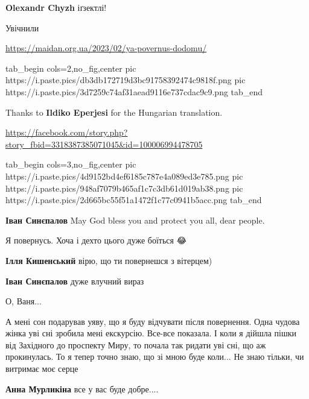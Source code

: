 \begin{itemize} %
\textbf{Olexandr Chyzh} іґзектлі!
\end{itemize} %


Увічнили

\url{https://maidan.org.ua/2023/02/ya-povernus-dodomu/}

\ifcmt
  tab_begin cols=2,no_fig,center
    pic https://i.paste.pics/db3db172719d3bc91758392474c9818f.png
    pic https://i.paste.pics/3d7259c74af31aead9116e737cdac9c9.png
  tab_end
\fi


Thanks to \textbf{Ildiko Eperjesi} for the Hungarian translation.

\url{https://facebook.com/story.php?story_fbid=3318387385071045&id=100006994478705}

\ifcmt
  tab_begin cols=3,no_fig,center
     pic https://i.paste.pics/4d9152bd4ef6185c787e4a089ed3e785.png
     pic https://i.paste.pics/948af7079b465af1c7c3db61d019ab38.png
     pic https://i.paste.pics/2d665bc55f51a1472f1c77c0941b5acc.png
  tab_end
\fi

\begin{itemize} %
\textbf{Іван Синєпалов} May God bless you and protect you all, dear people.
\end{itemize} %


Я повернусь. Хоча і дехто цього дуже боїться 😂

\begin{itemize} %
\textbf{Ілля Кишенський} вірю, що ти повернешся з вітерцем)

\textbf{Іван Синєпалов} дуже влучний вираз 💪
\end{itemize} %


О, Ваня...


А мені сон подарував уяву, що я буду відчувати після повернення. Одна чудова
жінка уві сні зробила мені екскурсію. Все-все показала. І коли я дійшла пішки
від Західного до проспекту Миру, то почала так ридати уві сні, що аж
прокинулась. То я тепер точно знаю, що зі мною буде коли... Не знаю тільки, чи
витримає моє серце

\begin{itemize} %
\textbf{Анна Мурликіна} все у вас буде добре....
\end{itemize} %

